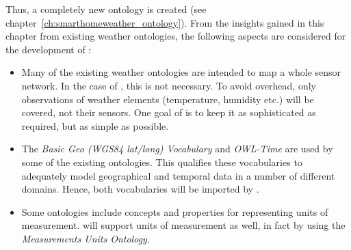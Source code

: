 Thus, a completely new ontology is created (see chapter~\ref{ch:smarthomeweather_ontology}). From the insights gained in this chapter from existing weather ontologies, the following aspects are considered for the development of \smarthomeweather:

\begin{itemize}
  \item Many of the existing weather ontologies are intended to map a whole sensor network. In the case of \smarthomeweather, this is not necessary. To avoid overhead, only observations of weather elements (temperature, humidity etc.) will be covered, not their sensors. One goal of \smarthomeweather is to keep it as sophisticated as required, but as simple as possible.
  
  \item The \emph{Basic Geo (WGS84 lat/long) Vocabulary} and \emph{OWL-Time} are used by some of the existing ontologies. This qualifies these vocabularies to adequately model geographical and temporal data in a number of different domains. Hence, both vocabularies will be imported by \smarthomeweather.
  
  \item Some ontologies include concepts and properties for representing units of measurement. \smarthomeweather will support units of measurement as well, in fact by using the \emph{Measurements Units Ontology}.
\end{itemize}

